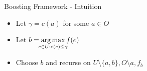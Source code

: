 \begin{frame}{Boosting Framework - Intuition}
        \begin{itemize}[<+(1)>]
            \item Let $\gamma = c(a)$ for some $a \in O$
            \item Let $b = \displaystyle{\argmax_{\mathclap{e \in U : c(e) \leq \gamma}} f(e)}$
            \item Choose $b$ and recurse on $U \setminus \{a, b\}, O \setminus a, f_b$
        \end{itemize}
\end{frame}